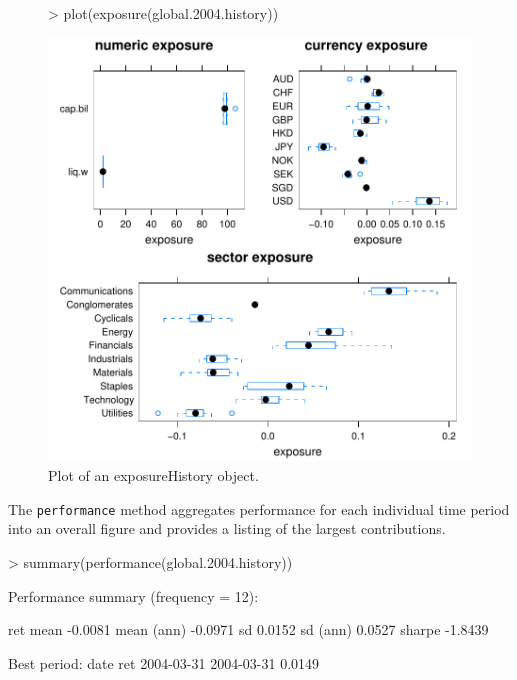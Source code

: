 \documentclass[a4paper]{report}
\begin{document}
\begin{article}
\begin{figure}
\centering
\vspace*{.1in}
\begin{Schunk}
\begin{Sinput}
> plot(exposure(global.2004.history))
\end{Sinput}
\end{Schunk}
\includegraphics{portfolio-018}
\caption{\label{figure:plot.exposureHistory} Plot of an exposureHistory object.}
\end{figure}


The \texttt{performance} method aggregates performance for each
individual time period into an overall figure and provides a listing
of the largest contributions.

\begin{Schunk}
\begin{Sinput}
> summary(performance(global.2004.history))
\end{Sinput}
\begin{Soutput}
Performance summary (frequency = 12):

               ret
mean       -0.0081
mean (ann) -0.0971
sd          0.0152
sd (ann)    0.0527
sharpe     -1.8439

Best period:
                 date    ret
2004-03-31 2004-03-31 0.0149



\end{Soutput}
\end{Schunk}
\end{article}
\end{document}

